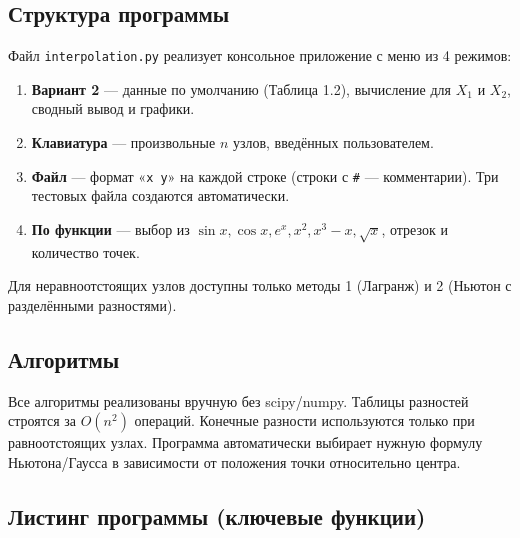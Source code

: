 \documentclass[a4paper,12pt]{article}
\begin{document}
\subsection{Структура программы}

Файл \texttt{interpolation.py} реализует консольное приложение с меню из 4
режимов:
\begin{enumerate}
    \item \textbf{Вариант 2} --- данные по умолчанию (Таблица 1.2), вычисление
          для $X_1$ и $X_2$, сводный вывод и графики.
    \item \textbf{Клавиатура} --- произвольные $n$ узлов, введённых пользователем.
    \item \textbf{Файл} --- формат «\texttt{x y}» на каждой строке (строки
          с \texttt{\#} --- комментарии). Три тестовых файла создаются
          автоматически.
    \item \textbf{По функции} --- выбор из $\sin x,\cos x,e^x,x^2,x^3-x,\sqrt{x}$,
          отрезок и количество точек.
\end{enumerate}

Для неравноотстоящих узлов доступны только методы 1 (Лагранж) и
2 (Ньютон с разделёнными разностями).

\subsection{Алгоритмы}

Все алгоритмы реализованы вручную без scipy/numpy.
Таблицы разностей строятся за $O(n^2)$ операций.
Конечные разности используются только при равноотстоящих узлах.
Программа автоматически выбирает нужную формулу Ньютона/Гаусса
в зависимости от положения точки относительно центра.

\subsection{Листинг программы (ключевые функции)}
\end{document}
